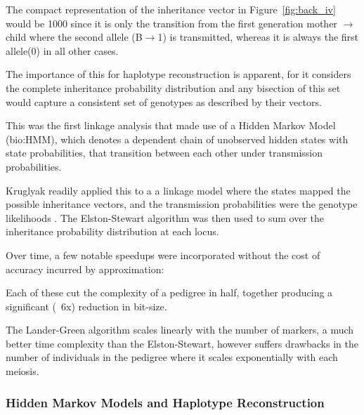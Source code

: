 The compact representation of the inheritance vector in Figure~\ref{fig:back_iv} would be 1000 since it is only the transition from the first generation mother \(\rightarrow\) child where the second allele (B\(\rightarrow\)1) is transmitted, whereas it is always the first allele(0) in all other cases.

The importance of this for haplotype reconstruction is apparent, for it considers the complete inheritance probability distribution and any bisection of this set would capture a consistent set of genotypes as described by their vectors.

This was the first linkage analysis that made use of a Hidden Markov Model (\gls{bio:HMM}),  which denotes a dependent chain of unobserved hidden states with state probabilities, that transition between each other under transmission probabilities.  

Kruglyak readily applied this to a a linkage model where the states mapped the possible inheritance vectors, and the transmission probabilities were the genotype likelihoods \cite{kruglyak_parametric_1996}. The Elston-Stewart algorithm was then used to sum over the inheritance probability distribution at each locus.

Over time, a few notable speedups were incorporated without the cost of accuracy incurred by approximation:

\begin{description}
\end{description}

Each of these cut the complexity of a pedigree in half, together producing a significant (~6x) reduction in bit-size.

The Lander-Green algorithm scales linearly with the number of markers, a much better time complexity than the Elston-Stewart, however suffers drawbacks in the number of individuals in the pedigree where it scales exponentially with each meiosis.


\subsubsection{Hidden Markov Models and Haplotype Reconstruction}

